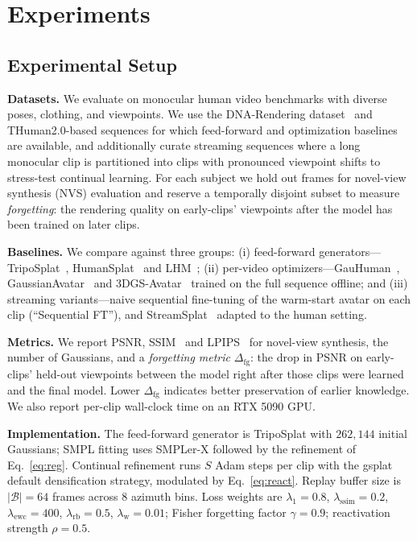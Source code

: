 \section{Experiments}\label{sec:experiments}

\subsection{Experimental Setup}\label{sec:exp:setup}
\textbf{Datasets.} We evaluate on monocular human video benchmarks with
diverse poses, clothing, and viewpoints. We use the DNA-Rendering
dataset~\cite{guo2026pointsplat} and THuman2.0-based sequences for which
feed-forward and optimization baselines are available, and additionally
curate streaming sequences where a long monocular clip is partitioned into
clips with pronounced viewpoint shifts to stress-test continual learning.
For each subject we hold out frames for novel-view synthesis (NVS)
evaluation and reserve a temporally disjoint subset to measure
\emph{forgetting}: the rendering quality on early-clips' viewpoints after
the model has been trained on later clips.

\textbf{Baselines.} We compare against three groups: (i) feed-forward
generators---TripoSplat~\cite{yan2026triposplat},
HumanSplat~\cite{pan2024humansplat} and LHM~\cite{qiu2025lhm}; (ii)
per-video optimizers---GauHuman~\cite{hu2024gauhuman},
GaussianAvatar~\cite{hu2024gaussianavatar} and
3DGS-Avatar~\cite{qian2024gsavatar} trained on the full sequence offline;
and (iii) streaming variants---naive sequential fine-tuning of the
warm-start avatar on each clip (``Sequential FT''), and
StreamSplat~\cite{wu2025streamsplat} adapted to the human setting.

\textbf{Metrics.} We report PSNR, SSIM~\cite{wang2004ssim} and
LPIPS~\cite{zhang2018lpips} for novel-view synthesis, the number of
Gaussians, and a \emph{forgetting metric} $\Delta_{\mathrm{fg}}$: the
drop in PSNR on early-clips' held-out viewpoints between the model right
after those clips were learned and the final model. Lower
$\Delta_{\mathrm{fg}}$ indicates better preservation of earlier
knowledge. We also report per-clip wall-clock time on an RTX 5090 GPU.

\textbf{Implementation.} The feed-forward generator is TripoSplat with
$262{,}144$ initial Gaussians; SMPL fitting uses SMPLer-X followed by the
refinement of Eq.~\eqref{eq:reg}. Continual refinement runs $S$ Adam steps
per clip with the gsplat~\cite{ye2024gsplat} default densification
strategy, modulated by Eq.~\eqref{eq:react}. Replay buffer size is
$|\mathcal{B}|{=}64$ frames across 8 azimuth bins. Loss weights are
$\lambda_1{=}0.8$, $\lambda_{\mathrm{ssim}}{=}0.2$,
$\lambda_{\mathrm{ewc}}{=}400$, $\lambda_{\mathrm{rb}}{=}0.5$,
$\lambda_{\mathrm{w}}{=}0.01$; Fisher forgetting factor $\gamma{=}0.9$;
reactivation strength $\rho{=}0.5$.

